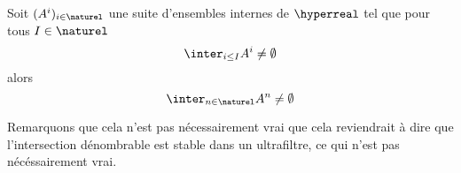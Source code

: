 \begin{theorem} 
	\label{theorem:aleph_1_saturation}
	Soit $(A^{i})_{i \in \naturel}$ une suite d'ensembles internes de
	$\hyperreal$ tel que pour tous $I \in \naturel$
	\begin{equation}
		\inter_{i \leq I} A^{i} \neq \emptyset
	\end{equation}
	alors
	\begin{equation}
		\inter_{n \in \naturel} A^{n} \neq \emptyset
	\end{equation}
\end{theorem}

Remarquons que cela n'est pas nécessairement vrai que cela reviendrait à dire
que l'intersection dénombrable est stable dans un ultrafiltre, ce qui n'est pas
nécéssairement vrai.

